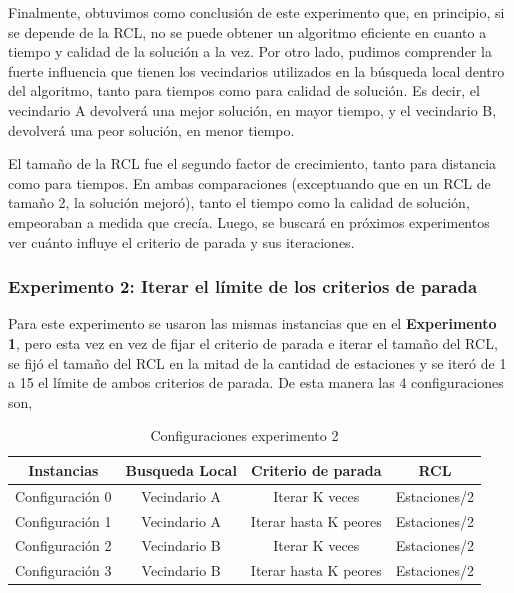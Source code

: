 \par Finalmente, obtuvimos como conclusión de este experimento que, en principio, si se depende de la RCL, no se puede obtener un algoritmo eficiente en cuanto a tiempo y calidad de la solución a la vez. Por otro lado, pudimos comprender la fuerte influencia que tienen los vecindarios utilizados en la búsqueda local dentro del algoritmo, tanto para tiempos como para calidad de solución. Es decir, el vecindario A devolverá una mejor solución, en mayor tiempo, y el vecindario B, devolverá una peor solución, en menor tiempo. 
\par El tamaño de la RCL fue el segundo factor de crecimiento, tanto para distancia como para tiempos. En ambas comparaciones (exceptuando que en un RCL de tamaño 2, la solución mejoró), tanto el tiempo como la calidad de solución, empeoraban a medida que crecía. Luego, se buscará en próximos experimentos ver cuánto influye el criterio de parada y sus iteraciones.



\subsubsection{Experimento 2: Iterar el límite de los criterios de parada}

Para este experimento se usaron las mismas instancias que en el \textbf{Experimento 1}, pero esta vez en vez de fijar el criterio de parada e iterar el tamaño del RCL, se fijó el tamaño del RCL en la mitad de la cantidad de estaciones y se iteró de 1 a 15 el límite de ambos criterios de parada. De esta manera las 4 configuraciones son,


\begin{table}[H]
\centering
\begin{tabular}{ |c|c|c|c| } 
 \hline
 Instancias&Busqueda Local&Criterio de parada&RCL\\ 
 \hline
 Configuración 0 & Vecindario A & Iterar K veces & Estaciones/2\\
 \hline
 Configuración 1 & Vecindario A & Iterar hasta K peores & Estaciones/2\\
 \hline
 Configuración 2 & Vecindario B & Iterar K veces  & Estaciones/2\\
 \hline
 Configuración 3 & Vecindario B & Iterar hasta K peores & Estaciones/2\\
 \hline
\end{tabular}
\caption{Configuraciones experimento 2}
\end{table}

